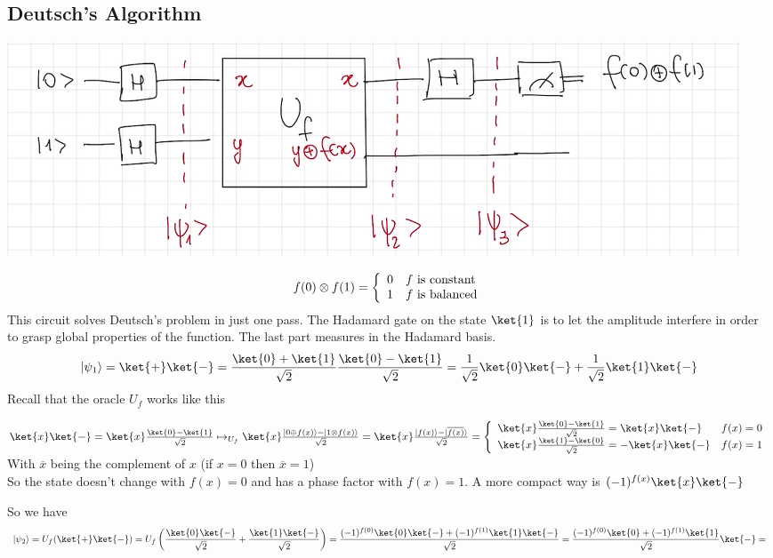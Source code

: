 \documentclass[10pt]{report}
\begin{document}
\subsection{Deutsch's Algorithm}
\begin{center}
	\includegraphics[scale=0.5]{22.png}
\end{center}
$$f(0)\otimes f(1)=\left\{\begin{array}{c l}
0 & f\hbox{ is constant}\\
1 & f\hbox{ is balanced}
\end{array}\right.$$
This circuit solves Deutsch's problem in just one pass. The Hadamard gate on the state $\ket{1}$ is to let the amplitude interfere in order to grasp global properties of the function. The last part measures in the Hadamard basis.
$$|\psi_1\rangle = \ket{+}\ket{-} = \frac{\ket{0}+\ket{1}}{\sqrt{2}}\frac{\ket{0}-\ket{1}}{\sqrt{2}} = \frac{1}{\sqrt{2}}\ket{0}\ket{-} + \frac{1}{\sqrt{2}}\ket{1}\ket{-}$$
Recall that the oracle $U_f$ works like this\begin{list}{}{}
	\item $\ket{x}\ket{-} = \ket{x}\frac{\ket{0}-\ket{1}}{\sqrt{2}} \mapsto_{U_f} \ket{x}\frac{|0\oplus f(x)\rangle - |1\otimes f(x)\rangle}{\sqrt{2}} = \ket{x}\frac{|f(x)\rangle - |\overline{f(x)}\rangle}{\sqrt{2}} = \left\{\begin{array}{l l}
	\ket{x}\frac{\ket{0}-\ket{1}}{\sqrt{2}} = \ket{x}\ket{-} & f(x) = 0\\
	\ket{x}\frac{\ket{1}-\ket{0}}{\sqrt{2}} = -\ket{x}\ket{-} & f(x) = 1
\end{array}	 \right.$\\
	With $\overline{x}$ being the complement of $x$ (if $x=0$ then $\overline{x} = 1$)\\
	So the state doesn't change with $f(x) = 0$ and has a phase factor with $f(x) = 1$. A more compact way is $(-1)^{f(x)}\ket{x}\ket{-}$
\end{list}
So we have $$|\psi_2\rangle = U_f(\ket{+}\ket{-}) = U_f\left(\frac{\ket{0}\ket{-}}{\sqrt{2}}+\frac{\ket{1}\ket{-}}{\sqrt{2}}\right) = \frac{(-1)^{f(0)}\ket{0}\ket{-} + (-1)^{f(1)}\ket{1}\ket{-}}{\sqrt{2}} = \frac{(-1)^{f(0)}\ket{0} + (-1)^{f(1)}\ket{1}}{\sqrt{2}}\ket{-} =$$
\end{document}

